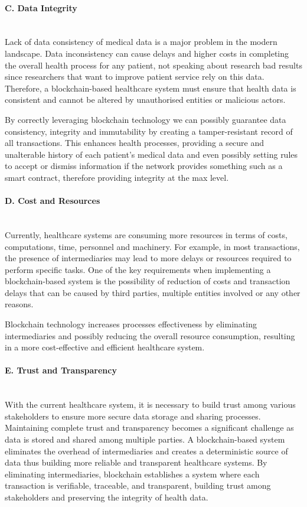 \paragraph{C. Data Integrity} \mbox{}\\
Lack of data consistency of medical data is a major problem in the modern landscape. Data inconsistency can cause delays and higher costs in completing the overall health process for any patient, not speaking about research bad results since researchers that want to improve patient service rely on this data. Therefore, a blockchain-based healthcare system must ensure that health data is consistent and cannot be altered by unauthorised entities or malicious actors.

By correctly leveraging blockchain technology we can possibly guarantee data consistency, integrity and immutability by creating a tamper-resistant record of all transactions. This enhances health processes, providing a secure and unalterable history of each patient's medical data and even possibly setting rules to accept or dismiss information if the network provides something such as a smart contract, therefore providing integrity at the max level.
\paragraph{D. Cost and Resources} \mbox{}\\
Currently, healthcare systems are consuming more resources in terms of costs, computations, time, personnel and machinery. For example, in most transactions, the presence of intermediaries may lead to more delays or resources required to perform specific tasks. One of the key requirements when implementing a blockchain-based system is the possibility of reduction of costs and transaction delays that can be caused by third parties, multiple entities involved or any other reasons.

Blockchain technology increases processes effectiveness by eliminating intermediaries and possibly reducing the overall resource consumption, resulting in a more cost-effective and efficient healthcare system.
\paragraph{E. Trust and Transparency} \mbox{}\\
With the current healthcare system, it is necessary to build trust among various stakeholders to ensure more secure data storage and sharing processes. Maintaining complete trust and transparency becomes a significant challenge as data is stored and shared among multiple parties. A blockchain-based system eliminates the overhead of intermediaries and creates a deterministic source of data thus building more reliable and transparent healthcare systems.
By eliminating intermediaries, blockchain establishes a system where each transaction is verifiable, traceable, and transparent, building trust among stakeholders and preserving the integrity of health data.

